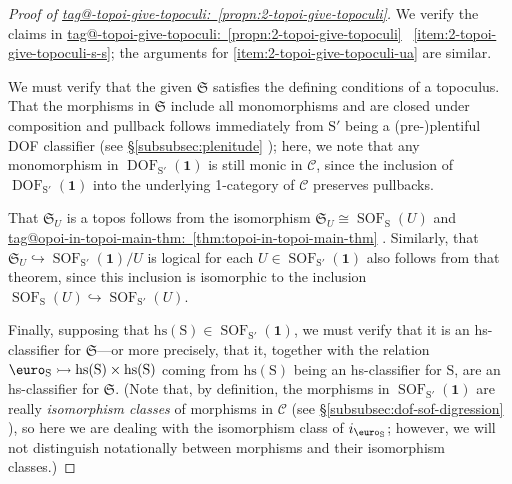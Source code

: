 \documentclass{amsart}
\makeatletter
\newcommand\cC{\mathcal{C}}
\newcommand\DOF{\operatorname{DOF}}
\newcommand\Ein{\mathrel{\text{\textup{\euro}}}}
\newcommand\fS{\mathfrak{S}}
\newcommand\hs{\mathrm{hs}}
\newcommand\hto{\hookrightarrow}
\newcommand\rS{\mathrm{S}}
\newcommand\SOF{\operatorname{SOF}}
\newcommand\tm{\mathbf{1}}
\newcommand\tto{\rightarrowtail}
\newcommand\unEin{{\Ein}}
\newcommand\tagword[1]{\csname tag@#1\endcsname}
\def\label@tag#1:#2\@nil{#1}
\newcommand\labeltag[1]{\label@tag#1:\@nil}
\newcommand\jref[1]{%
  \texorpdfstring%
    {\hyperref[#1]{\tagword{\labeltag{#1}}~\ref*{#1}}}%
    {\tagword{\labeltag{#1}}~\ref*{#1}}%
}
\newcommand\prerefpost[3]{%
  \texorpdfstring%
    {\hyperref[#2]{#1\ref*{#2}#3}}%
    {#1\ref*{#2}#3}%
}
\newcommand\sref[1]{\prerefpost{\S}{#1}{}}
\theoremstyle{definition}
\theoremstyle{remark}
\theoremstyle{plainwithref}
\makeatother
\begin{document}
\begin{proof}[Proof of \jref{propn:2-topoi-give-topoculi}] \label{proof:2-topoi-give-topoculi}
  We verify the claims in \jref{propn:2-topoi-give-topoculi}~\ref{item:2-topoi-give-topoculi-s-s}; the arguments for \ref{item:2-topoi-give-topoculi-ua} are similar.

  We must verify that the given \( \fS \) satisfies the defining conditions of a topoculus.
  That the morphisms in \( \fS \) include all monomorphisms and are closed under composition and pullback follows immediately from \( \rS' \) being a (pre-)plentiful DOF classifier (see \sref{subsubsec:plenitude}); here, we note that any monomorphism in \( \DOF_{\rS'}(\tm) \) is still monic in \( \cC \), since the inclusion of \( \DOF_{\rS'}(\tm) \) into the underlying 1-category of \( \cC \) preserves pullbacks.

  That \( \fS_U \) is a topos follows from the isomorphism \( \fS_U \cong \SOF_{\rS}(U) \) and \jref{thm:topoi-in-topoi-main-thm}.
  Similarly, that \( \fS_{U} \hto \SOF_{\rS'}(\tm) / U \) is logical for each \( U \in \SOF_{\rS'}(\tm) \) also follows from that theorem, since this inclusion is isomorphic to the inclusion \( \SOF_{\rS}(U) \hto \SOF_{\rS'}(U) \).

  Finally, supposing that \( \hs(\rS) \in \SOF_{\rS'}(\tm) \), we must verify that it is an hs-classifier for \( \fS \)---or more precisely, that it, together with the relation \( \unEin_{\rS} \tto \hs(\rS) \times \hs(\rS) \) coming from \( \hs(\rS) \) being an hs-classifier for \( \rS \), are an hs-classifier for \( \fS \).
  (Note that, by definition, the morphisms in \( \SOF_{\rS'}(\tm) \) are really \emph{isomorphism classes} of morphisms in \( \cC \) (see \sref{subsubsec:dof-sof-digression}), so here we are dealing with the isomorphism class of \( i_{\unEin_{\rS}} \); however, we will not distinguish notationally between morphisms and their isomorphism classes.)


\end{proof}
\end{document}
